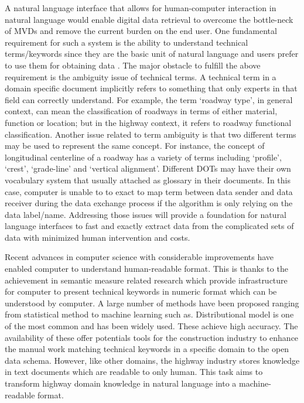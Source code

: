\documentclass[Journal, InsideFigs, DoubleSpace]{ascelike} %
\begin{document}
A natural language interface that allows for human-computer interaction in natural language would enable digital data retrieval to overcome the bottle-neck of MVDs and remove the current burden on the end user. One fundamental requirement for such a system is the ability to understand technical terms/keywords since they are the basic unit of natural language and users prefer to use them for obtaining data \cite{shekarpour11}. The major obstacle to fulfill the above requirement is the ambiguity issue of technical terms. A technical term in a domain specific document implicitly refers to something that only experts in that field can correctly understand. For example, the term ‘roadway type’, in general context, can mean the classification of roadways in terms of either material, function or location; but in the highway context, it refers to roadway functional classification. Another issue related to term ambiguity is that two different terms may be used to represent the same concept. For instance, the concept of longitudinal centerline of a roadway has a variety of terms including ‘profile’, ‘crest’, ‘grade-line’ and ‘vertical alignment’. Different DOTs may have their own vocabulary system that usually attached as glossary in their documents. In this case, computer is unable to to exact to map term between data sender and data receiver during the data exchange process if the algorithm is only relying on the data label/name. Addressing those issues will provide a foundation for natural language interfaces to fast and exactly extract data from the complicated sets of data with minimized human intervention and costs.
\par
Recent advances in computer science with considerable improvements have enabled computer to understand human-readable format. This is thanks to the achievement in semantic measure related research which provide infrastructure for computer to present technical keywords in numeric format which can be understood by computer. A large number of methods have been proposed ranging from statistical method to machine learning such as. Distributional model is one of the most common and has been widely used. These achieve high accuracy. The availability of these offer potentials tools for the construction industry to enhance the manual work matching technical keywords in a specific domain to the open data schema.  However, like other domains, the highway industry stores knowledge in text documents which are readable to only human. This task aims to transform highway domain knowledge in natural language into a machine-readable format.
\end{document}
